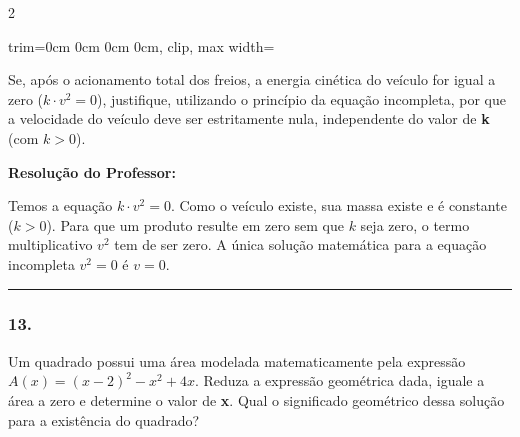 \begin{multicols*}{2}
\begin{center}
\begin{adjustbox}{trim=0cm 0cm 0cm 0cm, clip, max width=\larguraTikz}
\end{adjustbox}
\end{center}

Se, após o acionamento total dos freios, a energia cinética do veículo for igual a zero ($ k \cdot v^2 = 0 $), justifique, utilizando o princípio da equação incompleta, por que a velocidade do veículo deve ser estritamente nula, independente do valor de \textbf{k} (com $ k > 0 $).

\ifgabarito
    \begin{tcolorbox}[colback=CorTitUm!5, colframe=CorTitUm, boxrule=1pt, arc=4pt, left=6pt, right=6pt, top=6pt, bottom=6pt]
    \small\textbf{\textcolor{CorTitUm}{Resolução do Professor:}}\par\vspace{0.1cm}
    \color{CinzaEscuro}
    Temos a equação $k \cdot v^2 = 0$. Como o veículo existe, sua massa existe e é constante ($k > 0$). Para que um produto resulte em zero sem que $k$ seja zero, o termo multiplicativo $v^2$ tem de ser zero. A única solução matemática para a equação incompleta $v^2 = 0$ é $v = 0$.
    \end{tcolorbox}
\fi

\par\vspace{\espacoQuestao}

\noindent\textcolor{CorLinha}{\rule{\linewidth}{0.5pt}} 
\par\vspace{\espacoPreQuestao}
\subsubsection*{13.} Um quadrado possui uma área modelada matematicamente pela expressão $ A(x) = (x - 2)^2 - x^2 + 4x $. Reduza a expressão geométrica dada, iguale a área a zero e determine o valor de \textbf{x}. Qual o significado geométrico dessa solução para a existência do quadrado?


\end{multicols*}
